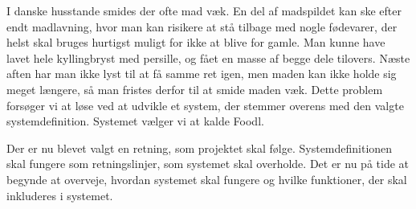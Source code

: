 I danske husstande smides der ofte mad væk. En del af madspildet kan \fx ske efter endt madlavning, hvor man kan risikere at stå tilbage med nogle fødevarer, der helst skal bruges hurtigst muligt for ikke at blive for gamle. Man kunne \fx have lavet hele kyllingbryst med persille, og fået en masse af begge dele tilovers. Næste aften har man ikke lyst til at få samme ret igen, men maden kan ikke holde sig meget længere, så man fristes derfor til at smide maden væk. Dette problem forsøger vi at løse ved at udvikle et system, der stemmer overens med den valgte systemdefinition. Systemet vælger vi at kalde Foodl.

Der er nu blevet valgt en retning, som projektet skal følge. Systemdefinitionen skal fungere som retningslinjer, som systemet skal overholde. Det er nu på tide at begynde at overveje, hvordan systemet skal fungere og hvilke funktioner, der skal inkluderes i systemet.
